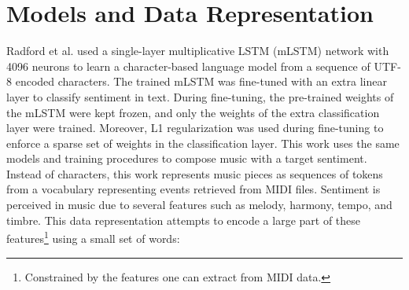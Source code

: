 \section{Models and Data Representation}
\label{sec:model}


Radford et al. \cite{radford_2017} used a single-layer multiplicative LSTM (mLSTM) network \cite{krause2017} with 4096 neurons to learn a character-based language model from a sequence of UTF-8 encoded characters. The trained mLSTM was fine-tuned with an extra linear layer to classify sentiment in text. During fine-tuning, the pre-trained weights of the mLSTM were kept frozen, and only the weights of the extra classification layer were trained. Moreover, L1 regularization was used during fine-tuning to enforce a sparse set of weights in the classification layer. This work uses the same models and training procedures to compose music with a target sentiment. Instead of characters, this work represents music pieces as sequences of tokens from a vocabulary representing events retrieved from MIDI files. Sentiment is perceived in music due to several features such as melody, harmony, tempo, and timbre\cite{kim2010music}. This data representation attempts to encode a large part of these features\footnote{Constrained by the features one can extract from MIDI data.} using a small set of words:




